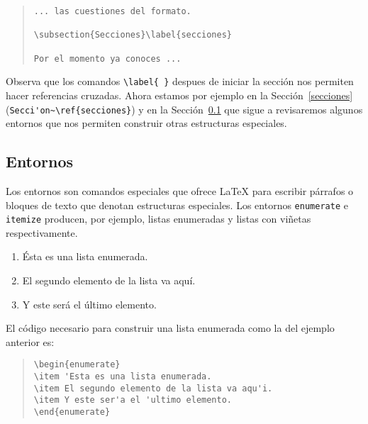 \begin{quote}
\begin{verbatim}
... las cuestiones del formato.

\subsection{Secciones}\label{secciones}

Por el momento ya conoces ...
\end{verbatim}
\end{quote}

Observa que los comandos \verb|\label{ }| despues de iniciar la secci\'on nos permiten
hacer referencias cruzadas. Ahora estamos por ejemplo en la Secci\'on~\ref{secciones}
(\verb|Secci'on~\ref{secciones}|) y en la Secci\'on~\ref{entornos} que sigue
a revisaremos algunos entornos que nos permiten construir otras estructuras especiales.


\subsection{Entornos}\label{entornos}

Los 
entornos son comandos especiales que ofrece \LaTeX{} para escribir p\'arrafos o bloques
de texto que denotan estructuras especiales. Los entornos \texttt{enumerate} e
\texttt{itemize} producen, por ejemplo, listas enumeradas y listas con vi\~netas
respectivamente.

\begin{enumerate}
\item \'Esta es una lista enumerada.
\item El segundo elemento de la lista va aqu\'i.
\item Y este ser\'a el \'ultimo elemento.
\end{enumerate}

El c\'odigo necesario para construir una lista enumerada como la del ejemplo anterior es:

\begin{quote}
\begin{verbatim}
\begin{enumerate}
\item 'Esta es una lista enumerada.
\item El segundo elemento de la lista va aqu'i.
\item Y este ser'a el 'ultimo elemento.
\end{enumerate}
\end{verbatim}
\end{quote}


